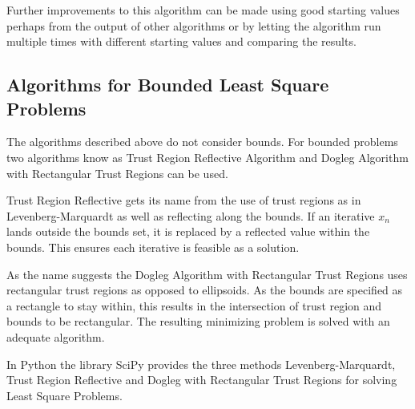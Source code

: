 Further improvements to this algorithm can be made using good starting values perhaps from the output of other algorithms or by letting the algorithm run multiple times with different starting values and comparing the results.

\subsection{Algorithms for Bounded Least Square Problems}
\label{subsec:algorithms_bounded_lsp}

The algorithms described above do not consider bounds. For bounded problems two algorithms know as Trust Region Reflective Algorithm and Dogleg Algorithm with Rectangular Trust Regions can be used.

Trust Region Reflective gets its name from the use of trust regions as in Levenberg-Marquardt as well as reflecting along the bounds\cite{branch1999}. If an iterative $x_n$ lands outside the bounds set, it is replaced by a reflected value within the bounds. This ensures each iterative is feasible as a solution.

As the name suggests the Dogleg Algorithm with Rectangular Trust Regions uses rectangular trust regions as opposed to ellipsoids.\cite{voglis2004} As the bounds are specified as a rectangle to stay within, this results in the intersection of trust region and bounds to be rectangular. The resulting minimizing problem is solved with an adequate algorithm\cite{Nocedal1999}.

In Python the library SciPy provides the three methods Levenberg-Marquardt, Trust Region Reflective and Dogleg with Rectangular Trust Regions for solving Least Square Problems.



